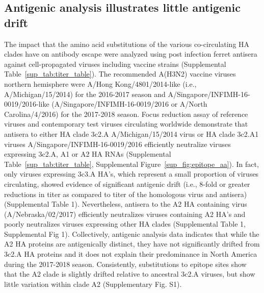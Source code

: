 \subsection*{Antigenic analysis illustrates little antigenic drift}
The impact that the amino acid substitutions of the various co-circulating HA clades have on antibody escape were analyzed using post infection ferret antisera against cell-propagated viruses including vaccine strains (Supplemental Table~\ref{sup_tab:titer_table}).
The recommended A(H3N2) vaccine viruses northern hemisphere were A/Hong Kong/4801/2014-like (i.e., A/Michigan/15/2014) for the 2016-2017 season and A/Singapore/INFIMH-16-0019/2016-like (A/Singapore/INFIMH-16-0019/2016 or A/North Carolina/4/2016) for the 2017-2018 season.
Focus reduction assay of reference viruses and contemporary test viruses circulating worldwide demonstrate that antisera to either HA clade 3c2.A A/Michigan/15/2014 virus or HA clade 3c2.A1 viruses A/Singapore/INFIMH-16-0019/2016 efficiently neutralize viruses expressing 3c2.A, A1 or A2 HA RNAs (Supplemental Table~\ref{sup_tab:titer_table}, Supplemental Figure~\ref{sup_fig:epitope_aa}).
In fact, only viruses expressing 3c3.A HA’s, which represent a small proportion of viruses circulating, showed evidence of significant antigenic drift (i.e., 8-fold or greater reductions in titer as compared to titer of the homologous virus and antisera) (Supplemental Table 1).
Nevertheless, antisera to the A2 HA containing virus (A/Nebraska/02/2017) efficiently neutralizes viruses containing A2 HA’s and poorly neutralizes viruses expressing other HA clades (Supplemental Table 1, Supplemental Fig 1).
Collectively, antigenic analysis data indicates that while the A2 HA proteins are antigenically distinct, they have not significantly drifted from 3c2.A HA proteins and it does not explain their predominance in North America during the 2017-2018 season.
Consistently, substitutions to epitope sites show that the A2 clade is slightly drifted relative to ancestral 3c2.A viruses, but show little variation within clade A2 (Supplementary Fig. S1).

